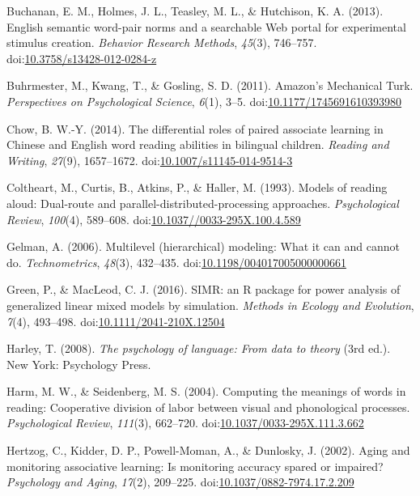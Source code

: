 \documentclass[english,man]{apa6}
\theoremstyle{definition}
\theoremstyle{definition}
\theoremstyle{definition}
\theoremstyle{remark}
\begin{document}
\hypertarget{ref-Buchanan2013}{}
Buchanan, E. M., Holmes, J. L., Teasley, M. L., \& Hutchison, K. A.
(2013). English semantic word-pair norms and a searchable Web portal for
experimental stimulus creation. \emph{Behavior Research Methods},
\emph{45}(3), 746--757.
doi:\href{https://doi.org/10.3758/s13428-012-0284-z}{10.3758/s13428-012-0284-z}

\hypertarget{ref-Buhrmester2011}{}
Buhrmester, M., Kwang, T., \& Gosling, S. D. (2011). Amazon's Mechanical
Turk. \emph{Perspectives on Psychological Science}, \emph{6}(1), 3--5.
doi:\href{https://doi.org/10.1177/1745691610393980}{10.1177/1745691610393980}

\hypertarget{ref-Chow2014}{}
Chow, B. W.-Y. (2014). The differential roles of paired associate
learning in Chinese and English word reading abilities in bilingual
children. \emph{Reading and Writing}, \emph{27}(9), 1657--1672.
doi:\href{https://doi.org/10.1007/s11145-014-9514-3}{10.1007/s11145-014-9514-3}

\hypertarget{ref-Coltheart1993}{}
Coltheart, M., Curtis, B., Atkins, P., \& Haller, M. (1993). Models of
reading aloud: Dual-route and parallel-distributed-processing
approaches. \emph{Psychological Review}, \emph{100}(4), 589--608.
doi:\href{https://doi.org/10.1037//0033-295X.100.4.589}{10.1037//0033-295X.100.4.589}

\hypertarget{ref-Gelman2006}{}
Gelman, A. (2006). Multilevel (hierarchical) modeling: What it can and
cannot do. \emph{Technometrics}, \emph{48}(3), 432--435.
doi:\href{https://doi.org/10.1198/004017005000000661}{10.1198/004017005000000661}

\hypertarget{ref-Green2016}{}
Green, P., \& MacLeod, C. J. (2016). SIMR: an R package for power
analysis of generalized linear mixed models by simulation. \emph{Methods
in Ecology and Evolution}, \emph{7}(4), 493--498.
doi:\href{https://doi.org/10.1111/2041-210X.12504}{10.1111/2041-210X.12504}

\hypertarget{ref-Harley2008}{}
Harley, T. (2008). \emph{The psychology of language: From data to
theory} (3rd ed.). New York: Psychology Press.

\hypertarget{ref-Harm2004}{}
Harm, M. W., \& Seidenberg, M. S. (2004). Computing the meanings of
words in reading: Cooperative division of labor between visual and
phonological processes. \emph{Psychological Review}, \emph{111}(3),
662--720.
doi:\href{https://doi.org/10.1037/0033-295X.111.3.662}{10.1037/0033-295X.111.3.662}

\hypertarget{ref-Hertzog2002}{}
Hertzog, C., Kidder, D. P., Powell-Moman, A., \& Dunlosky, J. (2002).
Aging and monitoring associative learning: Is monitoring accuracy spared
or impaired? \emph{Psychology and Aging}, \emph{17}(2), 209--225.
doi:\href{https://doi.org/10.1037/0882-7974.17.2.209}{10.1037/0882-7974.17.2.209}
\end{document}
